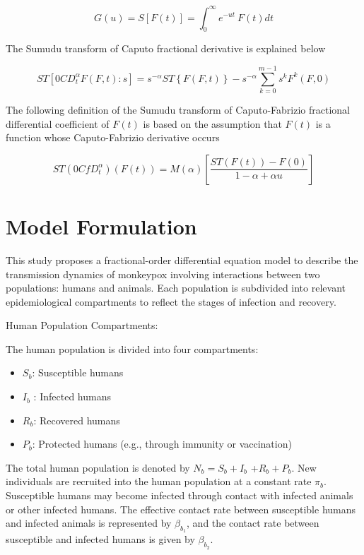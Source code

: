 \documentclass[10pt]{NSP1}
\begin{document}
\begin{equation}
G(u) = S\left\lbrack F(t) \right\rbrack = \int_{0}^{\infty}{}e^{- ut}\ F(t)dt
\end{equation}

The Sumudu transform of Caputo fractional derivative is explained below

\begin{equation}
ST\left\lbrack {0CD}_{t}^{\alpha}F(F,t):s \right\rbrack = s^{- \alpha}ST\left\{ F(F,t) \right\} - s^{- \alpha}\sum_{k = 0}^{m - 1}{}s^{k}F^{k}(F,0)
\end{equation}

The following definition of the Sumudu transform of Caputo-Fabrizio fractional differential coefficient of \(F(t)\) is based on the assumption that \(F(t)\) is a function whose Caputo-Fabrizio derivative occurs

\begin{equation}
ST\left( {0CfD}_{t}^{\alpha} \right)\left( F(t) \right) = M(\alpha)\left\lbrack \frac{ST\left( F(t) \right) - F(0)}{1 - \alpha + \alpha u} \right\rbrack
\end{equation}

\section{Model Formulation}

This study proposes a fractional-order differential equation model to describe the transmission dynamics of monkeypox involving interactions between two populations: humans and animals. Each population is subdivided into relevant epidemiological compartments to reflect the stages of infection and recovery.

Human Population Compartments:

The human population is divided into four compartments:

\begin{itemize}
\item
  \(S_{b}\): Susceptible humans
\item
  \(I_{b}\) : Infected humans
\item
  \(R_{b}\): Recovered humans
\item
  \(P_{b}\): Protected humans (e.g., through immunity or vaccination)
\end{itemize}

The total human population is denoted by \(N_{b} = S_{b} + I_{b}\) +\(R_{b} + P_{b}\). New individuals are recruited into the human population at a constant rate \(\pi_{b}\). Susceptible humans may become infected through contact with infected animals or other infected humans. The effective contact rate between susceptible humans and infected animals is represented by \(\beta_{b_{1}}\), and the contact rate between susceptible and infected humans is given by \(\beta_{b_{2}}\).
\end{document}
